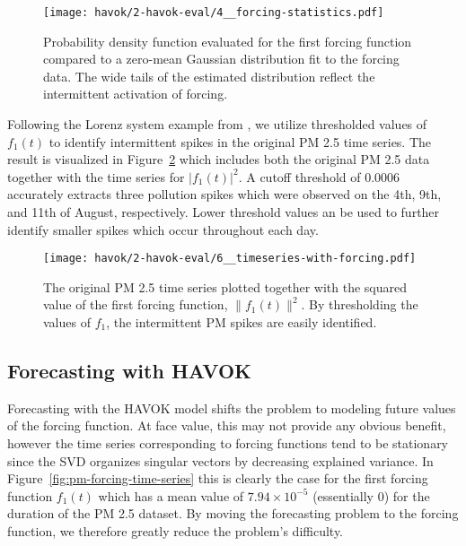 \begin{figure}[h]
  \centering
  \texttt{[image: havok/2-havok-eval/4\_\_forcing-statistics.pdf]}
  \caption{Probability density function evaluated for the first forcing function
  compared to a zero-mean Gaussian distribution fit to the forcing data. The
  wide tails of the estimated distribution reflect the intermittent activation
  of forcing.}
  \label{fig:pm-forcing-stats}
\end{figure}

Following the Lorenz system example from \cite{brunton-havok-orig}, we utilize
thresholded values of $f_1(t)$ to identify intermittent spikes in the original
PM 2.5 time series. The result is visualized in
Figure~\ref{fig:pm-time-series-w-forcing} which includes both the original PM
2.5 data together with the time series for $\lvert  f_1(t) \rvert^2$. A cutoff
threshold of $0.0006$ accurately extracts three pollution spikes which were
observed on the 4th, 9th, and 11th of August, respectively. Lower threshold
values an be used to further identify smaller spikes which occur throughout each day.

\begin{figure}[h]
  \centering
  \texttt{[image: havok/2-havok-eval/6\_\_timeseries-with-forcing.pdf]}
  \caption{The original PM 2.5 time series plotted together with the squared
    value of the first forcing function, $\lVert  f_1(t) \rVert^2$. By
    thresholding the values of $f_1$, the intermittent PM spikes are easily
    identified. }
  \label{fig:pm-time-series-w-forcing}
\end{figure}


\subsection{Forecasting with HAVOK}

Forecasting with the HAVOK model shifts the problem to modeling
future values of the forcing function. At face value, this may not provide any
obvious benefit, however the time series corresponding to forcing functions
tend to be stationary since the SVD organizes singular vectors by decreasing
explained variance. In Figure~\ref{fig:pm-forcing-time-series} this is clearly
the case for the first forcing function $f_1(t)$ which has a mean value of
$7.94\times10^{-5}$ (essentially 0) for the duration of the PM 2.5 dataset. By
moving the forecasting problem to the forcing function, we therefore greatly reduce
the problem's difficulty.


